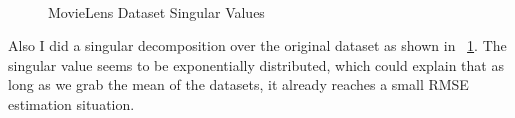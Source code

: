 \documentclass[paper=a4, fontsize=11pt]{scrartcl}
\numberwithin{equation}{section}        %
\numberwithin{figure}{section}          %
\numberwithin{table}{section}               %
\begin{document}
\begin{figure}
\centering
\mbox{
}
\caption{MovieLens Dataset Singular Values} \label{fig0}
\end{figure}

Also I did a singular decomposition over the original dataset as shown in ~\ref{fig0}. The singular value seems to be exponentially distributed, which could explain that as long as we grab the mean of the datasets, it already reaches a small RMSE estimation situation.
\end{document}
